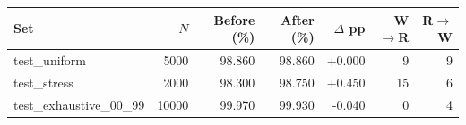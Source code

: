 \begin{tabular}{lrrrrrr}
\hline
Set & $N$ & Before (\%) & After (\%) & $\Delta$ pp & W$\to$R & R$\to$W \\
\hline
test\_uniform & 5000 & 98.860 & 98.860 & +0.000 & 9 & 9 \\
test\_stress & 2000 & 98.300 & 98.750 & +0.450 & 15 & 6 \\
test\_exhaustive\_00\_99 & 10000 & 99.970 & 99.930 & -0.040 & 0 & 4 \\
\hline
\end{tabular}

